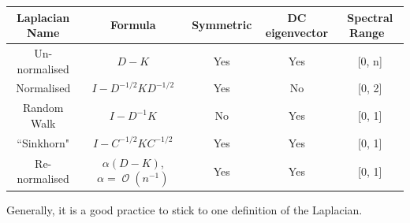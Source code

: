 \documentclass[]{article}
\DeclareMathOperator{\bigO}{\mathcal{O}}
\begin{document}
\begin{table}
 \centering
 \begin{tabular}{|c|c|c|c|c|}
  \hline
  Laplacian Name & Formula & Symmetric & DC eigenvector & Spectral Range \\
  \hline
  Un-normalised & \(D - K\) & Yes & Yes & [0, n] \\
  \hline
  Normalised & \(I - D^{-1/2}KD^{-1/2}\) & Yes & No & [0, 2] \\
  \hline
  Random Walk & \(I - D^{-1}K\) & No & Yes & [0, 1] \\
  \hline
  ``Sinkhorn" \cite{milanfar_symmetrizing_2013} & \(I - C^{-1/2}KC^{-1/2}\) & Yes & Yes & [0, 1] \\
  \hline
  Re-normalised & \(\alpha(D - K)\), \(\alpha = \bigO(n^{-1})\) & Yes & Yes & [0, 1] \\
  \hline
 \end{tabular}
\end{table}

Generally, it is a good practice to stick to one definition of the Laplacian.

\clearpage
\printbibliography
\end{document}

